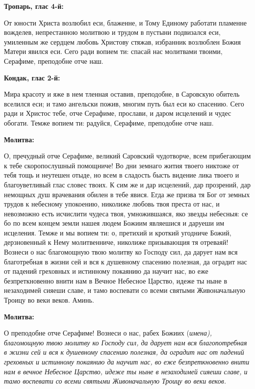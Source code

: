 \bigskip\bigskip\mychapterending

 
\bfseries Тропарь, глас 4-й:\normalfont{}


От юности Христа возлюбил еси, блаженне, и Тому Единому работати пламенне вожделев, непрестанною молитвою и трудом в пустыни подвизался еси, умиленным же сердцем любовь Христову стяжав, избранник возлюблен Божия Матери явился еси. Сего ради вопием ти: спасай нас молитвами твоими, Серафиме, преподобне отче наш.



\medskip
\bfseries Кондак, глас 2-й:\normalfont{}


Мира красоту и яже в нем тленная оставив, преподобне, в Саровскую обитель вселился еси; и тамо ангельски пожив, многим путь был еси ко спасению. Сего ради и Христос тебе, отче Серафиме, прослави, и даром исцелений и чудес обогати. Темже вопием ти: радуйся, Серафиме, преподобне отче наш.


\medskip
\bfseries Молитва:\normalfont{}


О, пречудный отче Серафиме, великий Саровский чудотворче, всем прибегающим к тебе скоропослушный помощниче! Во дни земнаго жития твоего никтоже от тебя тощь и неутешен отыде, но всем в сладость бысть видение лика твоего и благоуветливый глас словес твоих. К сим же и дар исцелений, дар прозрений, дар немощных душ врачевания обилен в тебе явися. Егда же призва тя Бог от земных трудов к небесному упокоению, николиже любовь твоя преста от нас, и невозможно есть исчислити чудеса твоя, умножившаяся, яко звезды небесныя: се бо по всем концем земли нашея людем Божиим являешися и даруеши им исцеления. Темже и мы вопием ти: о, претихий и кроткий угодниче Божий, дерзновенный к Нему молитвенниче, николиже призывающия тя отреваяй! Вознеси о нас благомощную твою молитву ко Господу сил, да дарует нам вся благотребная в жизни сей и вся к душевному спасению полезная, да оградит нас от падений греховных и истинному покаянию да научит нас, во еже безпреткновенно внити нам в Вечное Небесное Царство, идеже ты ныне в незаходимей сияеши славе, и тамо воспевати со всеми святыми Живоначальную Троицу во веки веков. Аминь.


\medskip
\bfseries Молитва:\normalfont{}


О преподобне отче Серафиме! Вознеси о нас, рабех Божиих (\itshape имена\normalfont{}), благомощную твою молитву ко Господу сил, да дарует нам вся благопотребная в жизни сей и вся к душевному спасению полезная, да оградит нас от падений греховных и истинному покаянию да научит нас, во еже безпреткновенно внити нам в вечное Небесное Царство, идеже ты ныне в незаходимей сияеши славе, и тамо воспевати со всеми святыми Живоначальную Троицу во веки веков.

